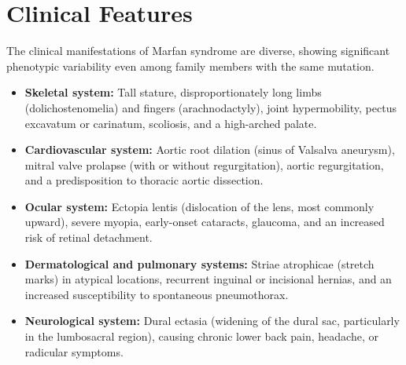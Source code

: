 \section*{Clinical Features}
The clinical manifestations of Marfan syndrome are diverse, showing significant phenotypic variability even among family members with the same mutation.
\begin{itemize}
    \item \textbf{Skeletal system:} Tall stature, disproportionately long limbs (dolichostenomelia) and fingers (arachnodactyly), joint hypermobility, pectus excavatum or carinatum, scoliosis, and a high-arched palate.
    \item \textbf{Cardiovascular system:} Aortic root dilation (sinus of Valsalva aneurysm), mitral valve prolapse (with or without regurgitation), aortic regurgitation, and a predisposition to thoracic aortic dissection.
    \item \textbf{Ocular system:} Ectopia lentis (dislocation of the lens, most commonly upward), severe myopia, early-onset cataracts, glaucoma, and an increased risk of retinal detachment.
    \item \textbf{Dermatological and pulmonary systems:} Striae atrophicae (stretch marks) in atypical locations, recurrent inguinal or incisional hernias, and an increased susceptibility to spontaneous pneumothorax.
    \item \textbf{Neurological system:} Dural ectasia (widening of the dural sac, particularly in the lumbosacral region), causing chronic lower back pain, headache, or radicular symptoms.
\end{itemize}


